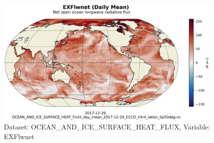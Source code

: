 \begin{figure}[H]
\centering
\includegraphics[scale=0.55]{../images/plots/latlon_plots/Ocean_and_Sea-Ice_Surface_Heat_Fluxes/EXFlwnet.png}
\caption{Dataset: OCEAN\_AND\_ICE\_SURFACE\_HEAT\_FLUX, Variable: EXFlwnet}
\label{tab:table-OCEAN_AND_ICE_SURFACE_HEAT_FLUX_EXFlwnet-Plot}
\end{figure}
\pagebreak
